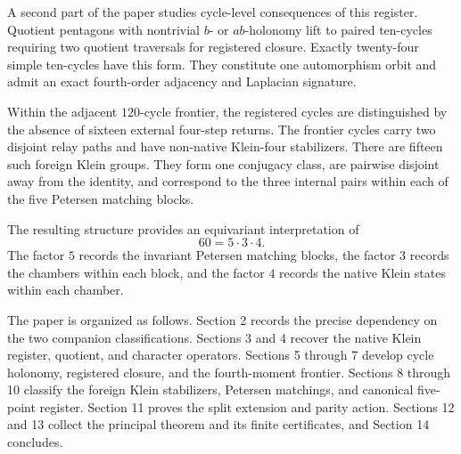 A second part of the paper studies cycle-level consequences of this
register. Quotient pentagons with nontrivial \(b\)- or \(ab\)-holonomy
lift to paired ten-cycles requiring two quotient traversals for
registered closure. Exactly twenty-four simple ten-cycles have this
form. They constitute one automorphism orbit and admit an exact
fourth-order adjacency and Laplacian signature.

Within the adjacent \(120\)-cycle frontier, the registered cycles are
distinguished by the absence of sixteen external four-step returns.
The frontier cycles carry two disjoint relay paths and have
non-native Klein-four stabilizers. There are fifteen such foreign
Klein groups. They form one conjugacy class, are pairwise disjoint
away from the identity, and correspond to the three internal pairs
within each of the five Petersen matching blocks.

The resulting structure provides an equivariant interpretation of
\[
60=5\cdot3\cdot4.
\]
The factor \(5\) records the invariant Petersen matching blocks, the
factor \(3\) records the chambers within each block, and the factor
\(4\) records the native Klein states within each chamber.

The paper is organized as follows. Section 2 records the precise
dependency on the two companion classifications. Sections 3 and 4
recover the native Klein register, quotient, and character operators.
Sections 5 through 7 develop cycle holonomy, registered closure, and
the fourth-moment frontier. Sections 8 through 10 classify the foreign
Klein stabilizers, Petersen matchings, and canonical five-point
register. Section 11 proves the split extension and parity action.
Sections 12 and 13 collect the principal theorem and its finite
certificates, and Section 14 concludes.
